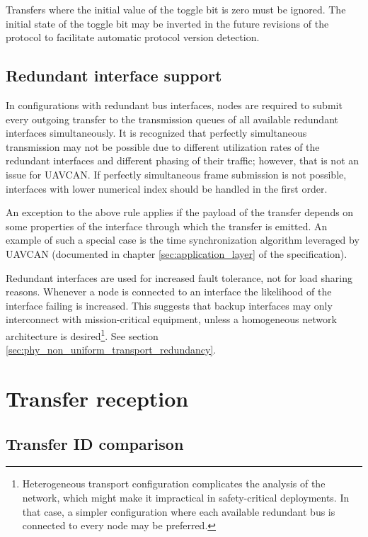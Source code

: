 Transfers where the initial value of the toggle bit is zero must be ignored.
The initial state of the toggle bit may be inverted in the future revisions of the protocol
to facilitate automatic protocol version detection.

\subsection{Redundant interface support}

In configurations with redundant bus interfaces,
nodes are required to submit every outgoing transfer to the transmission queues of
all available redundant interfaces simultaneously.
It is recognized that perfectly simultaneous transmission may not be possible due to different
utilization rates of the redundant interfaces and different phasing of their traffic;
however, that is not an issue for UAVCAN.
If perfectly simultaneous frame submission is not possible, interfaces with lower numerical index
should be handled in the first order.

An exception to the above rule applies if the payload of the transfer depends on some properties
of the interface through which the transfer is emitted.
An example of such a special case is the time synchronization algorithm leveraged by UAVCAN
(documented in chapter \ref{sec:application_layer} of the specification).

Redundant interfaces are used for increased fault tolerance, not for load sharing reasons.
Whenever a node is connected to an interface the likelihood of the interface failing is increased.
This suggests that backup interfaces may only interconnect with mission-critical equipment,
unless a homogeneous network architecture is desired\footnote{Heterogeneous transport configuration
complicates the analysis of the network, which might make it impractical in safety-critical deployments.
In that case, a simpler configuration where each available redundant bus is connected to every node may be
preferred.}.
See section \ref{sec:phy_non_uniform_transport_redundancy}.

\section{Transfer reception}\label{sec:transfer_reception}

\subsection{Transfer ID comparison}\label{sec:transfer_id_forward_distance}

